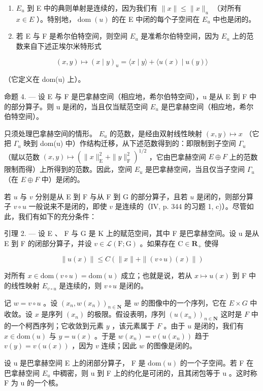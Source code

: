 \begin{enumerate}
\def\labelenumi{\arabic{enumi})}
\item
  \(E_{u}\) 到 E 中的典则单射是连续的，因为我们有 \(\|x\|\leqslant\|x\|_{u}\) （对所有 \(x\in E\) ）。特别地，\(\operatorname{dom}(u)\) 的在 E 中闭的每个子空间在 \(E_{u}\) 中也是闭的。
\item
  若 E 与 F 是希尔伯特空间，则空间 \(E_{u}\) 是准希尔伯特空间，因为 \(E_{u}\) 上的范数来自下述正埃尔米特形式
\end{enumerate}

\[
(x, y) \mapsto (x \mid y) _ {u} = \langle x \mid y \rangle + \langle u (x) \mid u (y) \rangle
\]

（它定义在 dom(u) 上）。

命题 4. --- 设 E 与 F 是巴拿赫空间（相应地，希尔伯特空间），u 是从 E 到 F 中的部分算子。则 u 是闭的，当且仅当赋范空间 \(E_{u}\) 是巴拿赫空间（相应地，希尔伯特空间）。

只须处理巴拿赫空间的情形。 \(E_{u}\) 的范数，是经由双射线性映射 \((x,y)\mapsto x\) （它把 \(\Gamma_{u}\) 映到 dom(u) 中）作结构迁移，从下述范数得到的：即限制到子空间 \(\Gamma_{u}\) （赋以范数 \((x,y)\mapsto(\|x\|_{\mathrm{E}}^{2}+\|y\|_{\mathrm{F}}^{2})^{1/2}\) ，它由巴拿赫空间 \(E\oplus F\) 上的范数限制而得）上所得到的范数。因此，空间 \(E_{u}\) 是巴拿赫空间，当且仅当子空间 \(\Gamma_{u}\) （在 \(E\oplus F\) 中）是闭的。

若 \(u\) 与 \(v\) 分别是从 E 到 F 与从 F 到 G 的部分算子，且若 \(u\) 是闭的，则部分算子 \(v \circ u\) 一般说来不是闭的，即使 \(v\) 是连续的（IV, p. 344 的习题 1, c)）。尽管如此，我们有如下的充分条件：

引理 2. --- 设 E 、 F 与 G 是 K 上的赋范空间，其中 F 是巴拿赫空间。设 u 是从 E 到 F 的闭部分算子，并设 \(v \in \mathcal{L}(\mathrm{F};\mathrm{G})\) 。如果存在 \(\mathrm{C} \in \mathbf{R}_{+}\) 使得

\[
\| u (x) \| \leqslant C (\| x \| + \| (v \circ u) (x) \|)
\]

对所有 \(x \in \text{dom}(v \circ u) = \text{dom}(u)\) 成立；也就是说，若从 \(x \mapsto u(x)\) 到 F 中的线性映射 \(E_{v \circ u}\) 是连续的，则 \(v \circ u\) 是闭的。

记 \(w = v \circ u\) 。设 \((x_n, w(x_n))_{n \in \mathbf{N}}\) 是 \(w\) 的图像中的一个序列，它在 \(E \times G\) 中收敛。设 \(x\) 是序列 \((x_n)\) 的极限。假设表明，序列 \((u(x_n))_{n \in \mathbf{N}}\) 这时是 \(F\) 中的一个柯西序列；它收敛到元素 \(y\) ，该元素属于 \(F\) 。由于 \(u\) 是闭的，我们有 \(x \in \text{dom}(u)\) 与 \(y = u(x)\) 。于是 \(w(x_n) = v(u(x_n))\) 趋于 \(v(y) = v(u(x))\) ，因为 \(v\) 连续；因此 \(w\) 的图像是闭的。

设 u 是巴拿赫空间 E 上的闭部分算子， F 是 \(\text{dom}(u)\) 的一个子空间。若 F 在巴拿赫空间 \(E_{u}\) 中稠密，则 u 到 F 上的约化是可闭的，且其闭包等于 u 。这时称 F 为 u 的一个核。

